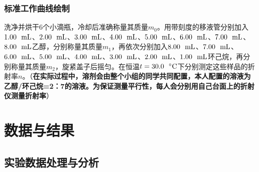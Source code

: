 \documentclass[12pt]{article}
\begin{document}
			\subsubsection{标准工作曲线绘制}
				洗净并烘干$6$个小滴瓶，冷却后准确称量其质量$m_{0}$。用带刻度的移液管分别加入$1.00\ \ {\rm mL}$、$2.00\ \ {\rm mL}$、$3.00\ \ {\rm mL}$、$4.00\ \ {\rm mL}$、$5.00\ \ {\rm mL}$、$6.00\ \ {\rm mL}$、$7.00\ \ {\rm mL}$、$8.00\ \ {\rm mL}$乙醇，分别称量其质量$m_{1}$，再依次分别加入$8.00\ \ {\rm mL}$、$7.00\ \ {\rm mL}$、$6.00\ \ {\rm mL}$、$5.00\ \ {\rm mL}$、$4.00\ \ {\rm mL}$、$3.00\ \ {\rm mL}$、$2.00\ \ {\rm mL}$、$1.00\ \ {\rm mL}$环己烷，再分别称量其质量$m_{2}$，旋紧盖子后摇匀。在恒温$t=30.0\ \ {\rm ^{\circ}C}$下分别测定这些样品的折射率$n$。（\textbf{在实际过程中，溶剂会由整个小组的同学共同配置，本人配置的溶液为乙醇/环己烷=2：7的溶液。为保证测量平行性，每人会分别用自己台面上的折射仪测量折射率}）\par 
				

	 \section{数据与结果}
 		\subsection{实验数据处理与分析}
\end{document}
